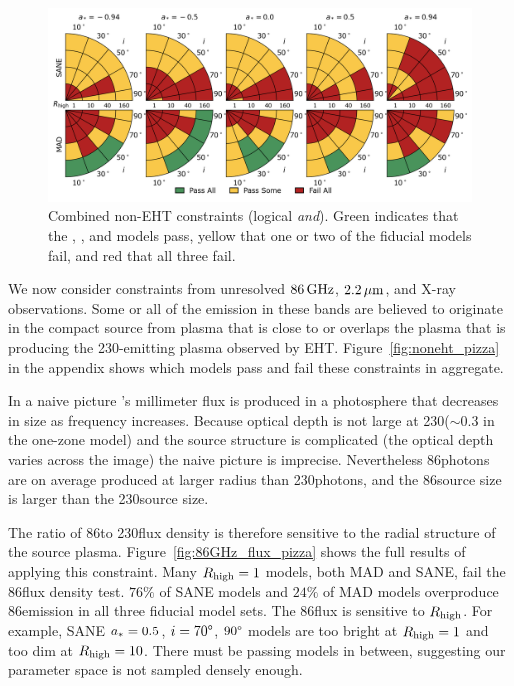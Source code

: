 \begin{figure}
  \centering
  \includegraphics[width=\textwidth]{./figures/Non_Interferometric_Constraints.png}
  \caption{Combined non-EHT constraints (logical {\em and}).
    Green indicates that the \kharma, \bhac, and \hamr models pass, yellow that one or two of the fiducial models fail, and red that all three fail.}
  \label{fig:non_eht_cuts}
\end{figure}

We now consider constraints from unresolved $86\,\mathrm{GHz}$, $2.2\,\mu\mathrm{m}$, and X-ray
observations.
Some or all of the emission in these bands are believed to originate
in the compact source from plasma that is close to or overlaps the
plasma that is producing the 230\GHz-emitting plasma observed by EHT.
Figure~\ref{fig:noneht_pizza} in the appendix shows which models
pass and fail these constraints in aggregate.


In a naive picture \sgra's millimeter flux is produced in a photosphere that decreases in size as frequency increases.
Because optical depth is not large at 230\GHz ($\sim 0.3$ in the one-zone model) and the source structure is complicated (the optical depth varies across the image) the naive picture is imprecise.
Nevertheless 86\GHz photons are on average produced at larger radius than 230\GHz photons, and the 86\GHz source size is larger than the 230\GHz source size.

The ratio of 86\GHz to 230\GHz flux density is therefore sensitive to the radial structure of the source plasma.
Figure~\ref{fig:86GHz_flux_pizza} shows the full results of applying this constraint.
Many $R_\mathrm{high} = 1$ models, both MAD and SANE, fail the 86\GHz flux density test.
$76\%$ of SANE models and $24\%$ of MAD models overproduce 86\GHz emission in all three fiducial model sets.
The 86\GHz flux is sensitive to $R_\mathrm{high}$.
For example, SANE $a_* = 0.5$, $i = 70\degree$, $90\degree$ models are too bright at $R_\mathrm{high} = 1$ and too dim at $R_\mathrm{high} = 10$.
There must be passing models in between, suggesting our parameter space is not sampled densely enough.

